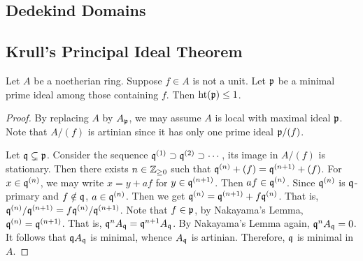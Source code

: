 \subsection{Dedekind Domains}


    


\subsection{Krull's Principal Ideal Theorem}

    \begin{theorem}\label{thm: Krull's principal ideal theorem}
        Let $A$ be a noetherian ring.
        Suppose $f \in A$ is not a unit.
        Let ${\mathfrak{p}}$ be a minimal prime ideal among those containing $f$.
        Then $\operatorname{ht}({\mathfrak{p}})\leq 1$.
    \end{theorem}
    \begin{proof}
        By replacing $A$ by $A_{\mathfrak{p}}$, we may assume $A$ is local with maximal ideal ${\mathfrak{p}}$.
        Note that $A/(f)$ is artinian since it has only one prime ideal ${\mathfrak{p}}/(f)$.

        Let ${\mathfrak{q}} \subsetneq {\mathfrak{p}}$.
        Consider the sequence ${\mathfrak{q}}^{(1)} \supset {\mathfrak{q}}^{(2)} \supset \cdots$, its image in $A/(f)$ is stationary.
        Then there exists $n \in {\mathbb{Z}}_{\geq 0}$ such that ${\mathfrak{q}}^{(n)} + (f) = {\mathfrak{q}}^{(n+1)} +(f)$.
        For $x \in {\mathfrak{q}}^{(n)}$, we may write $x = y + af$ for $y \in {\mathfrak{q}}^{(n+1)}$.
        Then $af \in {\mathfrak{q}}^{(n)}$.
        Since ${\mathfrak{q}}^{(n)}$ is ${\mathfrak{q}}$-primary and $f \notin {\mathfrak{q}}$, $a \in {\mathfrak{q}}^{(n)}$.
        Then we get ${\mathfrak{q}}^{(n)} = {\mathfrak{q}}^{(n+1)} + f {\mathfrak{q}}^{(n)}$.
        That is, ${\mathfrak{q}}^{(n)}/{\mathfrak{q}}^{(n+1)} = f {\mathfrak{q}}^{(n)}/{\mathfrak{q}}^{(n+1)}$.
        Note that $f \in {\mathfrak{p}}$, by Nakayama's Lemma, ${\mathfrak{q}}^{(n)} = {\mathfrak{q}}^{(n+1)}$.
        That is, ${\mathfrak{q}}^n A_{\mathfrak{q}} = {\mathfrak{q}}^{n+1} A_{\mathfrak{q}}$.
        By Nakayama's Lemma again, ${\mathfrak{q}}^n A_{\mathfrak{q}} = 0$.
        It follows that ${\mathfrak{q}} A_{\mathfrak{q}}$ is minimal, whence $A_{\mathfrak{q}}$ is artinian.
        Therefore, ${\mathfrak{q}}$ is minimal in $A$.
    \end{proof}

